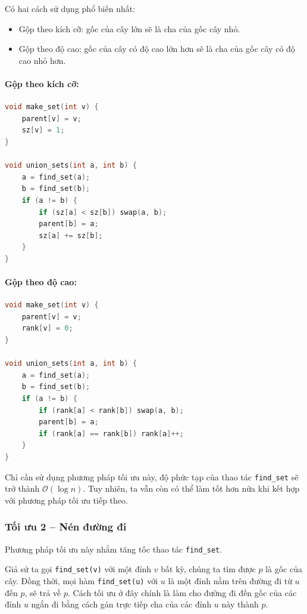 \documentclass{article}
\begin{document}
Có hai cách sử dụng phổ biến nhất:
\begin{itemize}
    \item Gộp theo kích cỡ: gốc của cây lớn sẽ là cha của gốc cây nhỏ.
    \item Gộp theo độ cao: gốc của cây có độ cao lớn hơn sẽ là cha của gốc cây có độ cao nhỏ hơn.
\end{itemize}

\paragraph{Gộp theo kích cỡ:}
\begin{lstlisting}[language=C++]
void make_set(int v) {
    parent[v] = v;
    sz[v] = 1;
}

void union_sets(int a, int b) {
    a = find_set(a);
    b = find_set(b);
    if (a != b) {
        if (sz[a] < sz[b]) swap(a, b);
        parent[b] = a;
        sz[a] += sz[b];
    }
}
\end{lstlisting}

\paragraph{Gộp theo độ cao:}
\begin{lstlisting}[language=C++]
void make_set(int v) {
    parent[v] = v;
    rank[v] = 0;
}

void union_sets(int a, int b) {
    a = find_set(a);
    b = find_set(b);
    if (a != b) {
        if (rank[a] < rank[b]) swap(a, b);
        parent[b] = a;
        if (rank[a] == rank[b]) rank[a]++;
    }
}
\end{lstlisting}

Chỉ cần sử dụng phương pháp tối ưu này, độ phức tạp của thao tác \texttt{find\_set} sẽ trở thành $\mathcal{O}(\log n)$. Tuy nhiên, ta vẫn còn có thể làm tốt hơn nữa khi kết hợp với phương pháp tối ưu tiếp theo.

\subsubsection*{Tối ưu 2 -- Nén đường đi}

Phương pháp tối ưu này nhằm tăng tốc thao tác \texttt{find\_set}.

Giả sử ta gọi \texttt{find\_set(v)} với một đỉnh $v$ bất kỳ, chúng ta tìm được $p$ là gốc của cây. Đồng thời, mọi hàm \texttt{find\_set(u)} với $u$ là một đỉnh nằm trên đường đi từ $u$ đến $p$, sẽ trả về $p$. Cách tối ưu ở đây chính là làm cho đường đi đến gốc của các đỉnh $u$ ngắn đi bằng cách gán trực tiếp cha của các đỉnh $u$ này thành $p$.
\end{document}
